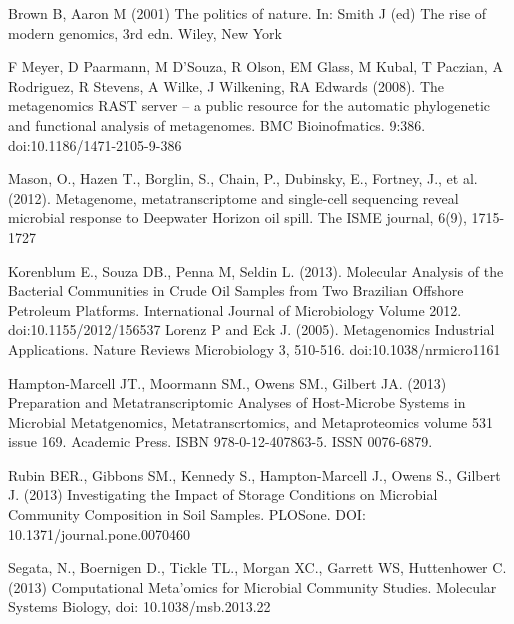 %
%
% 
% 
%

\begin{thebibliography}{99.}%
%
%
%
%
 Brown B, Aaron M (2001) The politics of nature. In: Smith J (ed) The rise of modern genomics, 3rd edn. Wiley, New York 

F Meyer, D Paarmann, M D'Souza, R Olson, EM Glass, M Kubal, T Paczian, A Rodriguez, R Stevens, A Wilke, J Wilkening, RA Edwards (2008). The metagenomics RAST server – a public resource for the automatic phylogenetic and functional analysis of metagenomes. BMC Bioinofmatics. 9:386. doi:10.1186/1471-2105-9-386

 Mason, O., Hazen T., Borglin, S., Chain, P., Dubinsky, E., Fortney, J., et al. (2012). Metagenome, metatranscriptome and single-cell sequencing reveal microbial response to Deepwater Horizon oil spill. The ISME journal, 6(9), 1715-1727

 Korenblum E., Souza DB., Penna M, Seldin L. (2013). Molecular Analysis of the Bacterial Communities in Crude Oil Samples from Two Brazilian Offshore Petroleum Platforms. International Journal of Microbiology Volume 2012. doi:10.1155/2012/156537
Lorenz P and Eck J. (2005). Metagenomics Industrial Applications. Nature Reviews Microbiology 3, 510-516. doi:10.1038/nrmicro1161

 Hampton-Marcell JT., Moormann SM., Owens SM., Gilbert JA. (2013) Preparation and Metatranscriptomic Analyses of Host-Microbe Systems in Microbial Metatgenomics, Metatranscrtomics, and Metaproteomics volume 531 issue 169. Academic Press. ISBN 978-0-12-407863-5. ISSN 0076-6879.

 Rubin BER., Gibbons SM., Kennedy S., Hampton-Marcell J., Owens S., Gilbert J. (2013) Investigating the Impact of Storage Conditions on Microbial Community Composition in Soil Samples. PLOSone. DOI: 10.1371/journal.pone.0070460

 Segata, N., Boernigen D., Tickle TL., Morgan XC., Garrett WS, Huttenhower C. (2013) Computational Meta’omics for Microbial Community Studies. Molecular Systems Biology, doi: 10.1038/msb.2013.22


\end{thebibliography}
